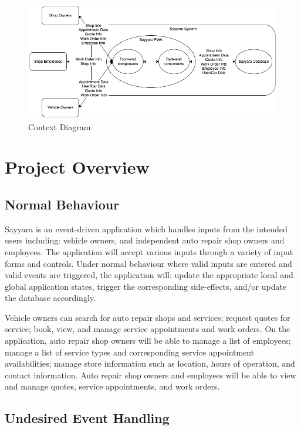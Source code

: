 \documentclass[12pt, titlepage]{article}
\begin{document}
\begin{figure}[H]
	\centering
	\includegraphics[width=\textwidth]{./diagrams/ContextDiagram.png}
	\caption{Context Diagram}
	\label{ContextDiagram}
\end{figure}


\section{Project Overview}

\subsection{Normal Behaviour}
Sayyara is an event-driven application which handles inputs from the intended users including:
vehicle owners, and independent auto repair shop owners and employees. The application will accept
various inputs through a variety of input forms and controls. Under normal behaviour where valid
inputs are entered and valid events are triggered, the application will: update the appropriate
local and global application states, trigger the corresponding side-effects, and/or update the
database accordingly.

Vehicle owners can search for auto repair shops and services; request quotes for service; book,
view, and manage service appointments and work orders. On the application, auto repair shop owners
will be able to manage a list of employees; manage a list of service types and corresponding
service appointment availabilities; manage store information such as location, hours of operation,
and contact information. Auto repair shop owners and employees will be able to view and manage
quotes, service appointments, and work orders.

\subsection{Undesired Event Handling}
\end{document}
